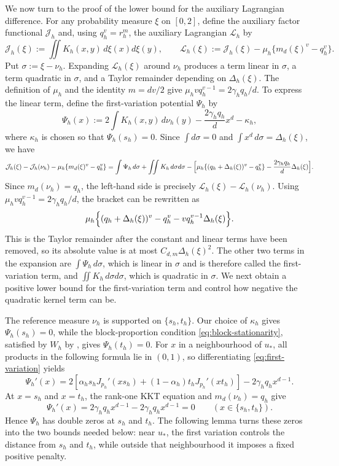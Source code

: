 We now turn to the proof of the lower bound for the auxiliary Lagrangian
difference.  For any probability measure $\xi$ on $[0,2]$, define the
auxiliary factor functional
$\mathcal J_h$ and, using $q_h^v=r_h^m$, the auxiliary Lagrangian
$\mathcal L_h$ by
\[
  \mathcal J_h(\xi)
  :=\iint K_h(x,y)\,d\xi(x)d\xi(y),
  \qquad
  \mathcal L_h(\xi)
  :=\mathcal J_h(\xi)-\mu_h\{m_d(\xi)^v-q_h^v\}.
\]
Put $\sigma:=\xi-\nu_h$.  Expanding $\mathcal L_h(\xi)$ around $\nu_h$
produces a term linear in $\sigma$, a term quadratic in $\sigma$, and a Taylor
remainder depending on $\Delta_h(\xi)$.  The definition of $\mu_h$ and the
identity $m=dv/2$ give
$\mu_hvq_h^{v-1}=2\gamma_hq_h/d$.  To express the linear term, define the
first-variation potential $\Psi_h$ by
\begin{equation}\label{eq:first-variation}
  \Psi_h(x):=2\int K_h(x,y)\,d\nu_h(y)
  -\frac{2\gamma_hq_h}{d}x^d-\kappa_h,
\end{equation}
where $\kappa_h$ is chosen so that $\Psi_h(s_h)=0$.
Since $\int d\sigma=0$ and $\int x^d\,d\sigma=\Delta_h(\xi)$, we have
\begin{equation*}
  \mathcal J_h(\xi)-\mathcal J_h(\nu_h)
    -\mu_h\{m_d(\xi)^v-q_h^v\}
  =\int\Psi_h\,d\sigma+\iint K_h\,d\sigma d\sigma
    -\Bigl[\mu_h\{(q_h+\Delta_h(\xi))^v-q_h^v\}
      -\frac{2\gamma_hq_h}{d}\Delta_h(\xi)\Bigr].
\end{equation*}
Since $m_d(\nu_h)=q_h$, the left-hand side is precisely
$\mathcal L_h(\xi)-\mathcal L_h(\nu_h)$.  Using
$\mu_hvq_h^{v-1}=2\gamma_hq_h/d$, the bracket can be rewritten as
\[
  \mu_h\Bigl\{(q_h+\Delta_h(\xi))^v-q_h^v
  -vq_h^{v-1}\Delta_h(\xi)\Bigr\}.
\]
This is the Taylor remainder after the constant and linear terms have been
removed, so its absolute value is at most
$C_{d,m}\Delta_h(\xi)^2$.  The other two terms in the expansion are
$\int\Psi_h\,d\sigma$, which is linear in $\sigma$ and is therefore called the
first-variation term, and $\iint K_h\,d\sigma d\sigma$, which is quadratic in
$\sigma$.  We next obtain a positive lower bound for the first-variation term
and control how negative the quadratic kernel term can be.

The reference measure $\nu_h$ is supported on $\{s_h,t_h\}$.  Our choice of
$\kappa_h$ gives $\Psi_h(s_h)=0$, while the block-proportion condition
\eqref{eq:block-stationarity}, satisfied by $W_h$ by
, gives $\Psi_h(t_h)=0$.  For $x$ in a
neighbourhood of $u_*$, all products in the following formula lie in $(0,1)$,
so differentiating \eqref{eq:first-variation} yields
\[
  \Psi_h'(x)
  =2\left[
    \alpha_hs_hJ_{p_h}'(xs_h)
    +(1-\alpha_h)t_hJ_{p_h}'(xt_h)
  \right]-2\gamma_hq_hx^{d-1}.
\]
At $x=s_h$ and $x=t_h$, the rank-one KKT equation and
$m_d(\nu_h)=q_h$ give
\[
  \Psi_h'(x)
  =2\gamma_hq_hx^{d-1}-2\gamma_hq_hx^{d-1}
  =0 \qquad (x\in\{s_h,t_h\}).
\]
Hence $\Psi_h$ has double zeros at $s_h$ and $t_h$.
The following lemma turns these zeros into the two bounds needed below: near
$u_*$, the first variation controls the distance from $s_h$ and $t_h$, while
outside that neighbourhood it imposes a fixed positive penalty.

